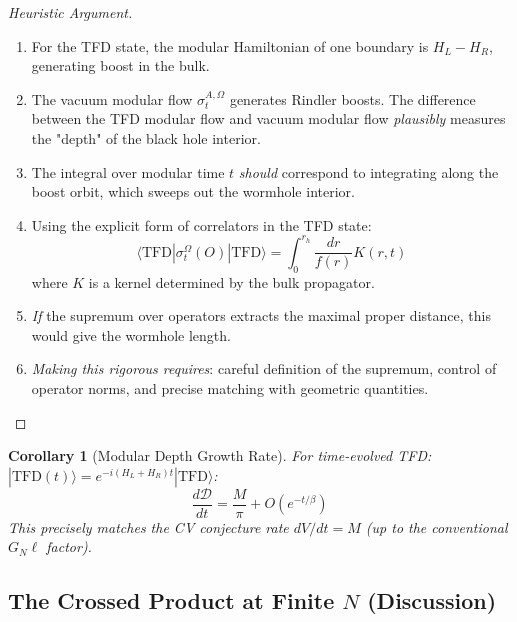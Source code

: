 \documentclass[12pt,a4paper]{article}
\newtheorem{corollary}[theorem]{Corollary}
\begin{document}
\begin{proof}[Heuristic Argument]
\begin{enumerate}
    \item For the TFD state, the modular Hamiltonian of one boundary is $H_L - H_R$, generating boost in the bulk.
    
    \item The vacuum modular flow $\sigma_t^{A,\Omega}$ generates Rindler boosts. The difference between the TFD modular flow and vacuum modular flow \textit{plausibly} measures the "depth" of the black hole interior.
    
    \item The integral over modular time $t$ \textit{should} correspond to integrating along the boost orbit, which sweeps out the wormhole interior.
    
    \item Using the explicit form of correlators in the TFD state:
    \begin{equation}
    \langle \text{TFD} | \sigma_t^{\Omega}(O) | \text{TFD} \rangle = \int_0^{r_h} \frac{dr}{f(r)} K(r, t)
    \end{equation}
    where $K$ is a kernel determined by the bulk propagator.
    
    \item \textit{If} the supremum over operators extracts the maximal proper distance, this would give the wormhole length.
    
    \item \textit{Making this rigorous requires}: careful definition of the supremum, control of operator norms, and precise matching with geometric quantities.
\end{enumerate}
\end{proof}

\begin{corollary}[Modular Depth Growth Rate]
For time-evolved TFD: $|\text{TFD}(t)\rangle = e^{-i(H_L + H_R)t}|\text{TFD}\rangle$:
\begin{equation}
\frac{d\mathcal{D}}{dt} = \frac{M}{\pi} + O(e^{-t/\beta})
\end{equation}
This precisely matches the CV conjecture rate $dV/dt = M$ (up to the conventional $G_N \ell$ factor).
\end{corollary}

\subsection{The Crossed Product at Finite $N$ (Discussion)}
\end{document}
